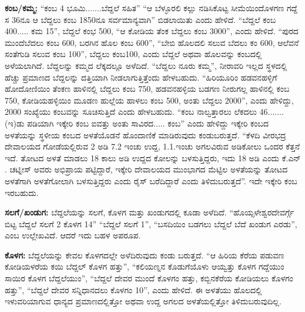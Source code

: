 \textbf{ಕಂಬ/ಕಮ್ಮ:} “ಕಂಬ 4 ಭೂಮಿ.......ಬೆದ್ದಲೆ ಸಹಿತ” “ಆ ಬೆಳ್ಳೂರಲಿ ಕಲ್ಲು ನಡಿಸಿಕೊಟ್ಟ ಸೀಮೆಯಿಂದೊಳಗಣ ಗದ್ದೆ ಸ 36ನೂ ಆ ಬೆದ್ದಲು ಕಂಬ 1850ನೂ ಸರ್ವಮಾನ್ಯವಾಗಿ” ಬಿಡಲಾಯಿತು ಎಂದು ಹೇಳಿದೆ. “ಬೆದ್ದಲೆ ಕಂಬ 400..... ಕಮ 15”, ಬೆದ್ದಲೆ ಕಂಭ 500, “ಆ ಕೋಡಿಯ ತೆಂಕ ಬೆದ್ದಲು ಕಂಬ 3000”, ಎಂದು ಹೇಳಿದೆ. “ಪುರದ ಮುಂದೆ\break ಬೆದಲು ಕಂಬ 600, ಬರಗಿನ ಹೊಲ ಕಂಬ 600”, “ಬೇಬಿ ಹೊಲದಲಿ ಸಲುವ ಬೆದಲು ಕಂ 600, ಆಲೆವನೆ ಸಂತೆಗುಡಿ ಸಲುವ ಕಂಬ 100”, ಬೆದ್ದಲು ಕಂಬ100, ಎಂದು ಬೆದ್ದಲೆ ಅಥವಾ ಹೊಲವನ್ನು ಕಂಬದಲ್ಲಿ ಅಳೆಯಲಾಗಿದೆ. ಬೆದ್ದಲನ್ನು ಕಮ್ಮದ ಲೆಕ್ಕದಲ್ಲೂ ಅಳೆದಿದೆ. “ಬೆದ್ದಲು ನೂರು ಕಮ್ಮ”, ನೀರಾವರಿ ಇಲ್ಲದ ಸ್ಥಳದಲ್ಲಿ ಹೆಚ್ಚು ಪ್ರಮಾಣದ ಬೆದ್ದಲನ್ನು ದತ್ತಿಯಾಗಿ ನೀಡಲಾಗುತ್ತಿತ್ತೆಂದು ಹೇಳಬಹುದು. “ಹಿರಿಯೂರಿಂ ಹಡವನಹಳ್ಳಿಗೆ ಹೋದೋಣಿಯಿಂ ತೆಂಕಣ ಹಾಳಿನಲ್ಲಿ ಬೆದ್ದಲು ಕಂಬ 750, ಹಡವನಹಳ್ಳಿಯ ಬಡಗಣ ನೀರುಗಲ್ಲ ಹಾಳಿನಲ್ಲಿ ಕಂಬ 750, ಕೋಡಿಯಹಳ್ಳಿಯಿಂ ಮೂಡಣ ಹುಲ್ಲೆಯ ಹಾಳಲು ಕಂಬ 500, ಅಂತು ಬೆದ್ದಲು 2000”, ಎಂದು ಹೇಳಿದ್ದು, 2000 ಸಂಖ್ಯೆಯು ಕಂಬವನ್ನು ಸೂಚಿಸುತ್ತಿದೆ ಎಂದು ಹೇಳಬಹುದು. “ಕಂಬ ನಾಲ್ವತ್ತಾರಲು ಲೆಕದಲು 46.......(ಇ)ಡು ಪಡಿಯಾಗಿ ಇಕ್ಕೇರಿ ಕಂಬ ಐವತ್ತು ಅಂತು ಸಾವಿರದ..... ಕಂಬ” ಎಂದು ಹೇಳಿದ್ದು ಇಕ್ಕೇರಿ ಕಂಬದ ಅಳತೆಯನ್ನು ಸ್ಥಳೀಯ ಕಂಬದ ಅಳತೆಯೊಡನೆ ಹೊಂದಾಣಿಕೆ ಮಾಡಿರುವುದು ಕಂಡುಬರುತ್ತದೆ. “ಕೆಳದಿ ವೀರಭದ್ರ ದೇವಾಲಯದ ಗೋಡೆಯಲ್ಲಿರುವ 2 ಅಡಿ 7.2 ಇಂಚು ಉದ್ದ, 1.1.ಇಂಚು ಅಗಲವಿರುವ ಅಡಿಕೋಲು ಒಂದರ ಕೆತ್ತನೆ ಇದೆ. ತೋಟದ ಅಳತೆ ಮಾಡಲು 18 ಕಾಲು ಅಡಿ ಉದ್ದದ ಕೋಲನ್ನು ಬಳಸುತ್ತಿದ್ದರು, ಇದು 18 ಅಡಿ ಎಂದು ಕೆ.ಎನ್​. ಚಟ್ನೀಸ್​ ಅವರು ಅಭಿಪ್ರಾಯ ಪಟ್ಟಿದ್ದಾರೆ, ಇಕ್ಕೇರಿ ದೇವಾಲಯದ ಮುಂಭಾಗದ ಮೆಟ್ಟಿಲ ಅಳತೆಯನ್ನು ತೋಟದ ಅಳತೆಗಾಗಿ ಅಳತೆಗೋಲಾಗಿ ಬಳಸುತ್ತಿದ್ದರು ಎಂದು ರೈಸ್​ ಬರೆದಿದ್ದಾರೆ ಎಂದು ತಿಳಿದುಬರುತ್ತದೆ”. ಇದೇ ಇಕ್ಕೇರಿ ಕಂಬ ಇರಬಹುದು.

\textbf{ಸಲಗೆ/ಖಂಡುಗ:} ಬೆದ್ದಲೆಯನ್ನು ಸಲಗೆ, ಕೊಳಗ ಮತ್ತು ಖಂಡುಗದಲ್ಲಿ ಕೂಡಾ ಅಳೆದಿದೆ. “ಹೊಯ್ಸಳೇಶ್ವರ\break ದೇವರ್ಗ್ಗೆ ಬಿಟ್ಟ ಬೆದ್ದಲೆ ಸಲಗೆ 2 ಕೊಳಗ 14” “ಬೆದ್ದಲೆ ಸಲಗೆ 1”, “ಬಸದಿಯಿಂ ಬಡಗಲು ಬೆದ್ದಲೆ ಬೆದೆ ಖಂಡುಗ ಎರಡು”, ಎಂಬ ಉಲ್ಲೇಖವಿದೆ. ಆದರೆ ಇದು ಬಹಳ ಅಪರೂಪ.

\textbf{ಕೊಳಗ:} ಬೆದ್ದಲೆಯನ್ನು ಕೇವಲ ಕೊಳಗದಲ್ಲೇ ಅಳೆದಿರುವುದು ಕಂಡು ಬರುತ್ತದೆ. “ಆ ಹಿರಿಯ ಕೆರೆಯ ಪಡುವಣ ಕೋಡಿಯಳರೆಯ ಕಯಿ ಬೆದ್ದಲ್​ ಕೊಳಗ ಹತ್ತು”, “ಕಲಿಯಣ್ನನ ಕೊಡುಗೆಯೊಳು ಆಯ್ವತ್ತು ಕೊಳಗ ಗದ್ದೆಯುಂ ಸಾಯಿರ ಕೊಳಗ ಬೆದ್ದಲೆಯುಂ”, “ಬೆದ್ದಲೆ ದೇವರ ಮುಂದೆ ಕೊಳಗಂ ಹತ್ತು, ಕಬ್ಬಿನಕೆರೆಯ ಕೋಡಿಯಲು ಕೊಳಗಂ ಹತ್ತು”, “ಬೆದ್ದಲೆ ದೇವರ ಸನ್ನಿಧಾನದಲು ಕೊಳಗಂ 10”, ಎಂದು ಹೇಳಿದೆ. ಈ ಅಳತೆಯು ಹೊಲದಲ್ಲಿ ಇಳುವರಿಯಾಗುವ ಧಾನ್ಯದ ಪ್ರಮಾಣದಲ್ಲಿತ್ತೋ ಅಥವಾ ಉದ್ದ ಅಗಲದ ಅಳತೆಯಲ್ಲಿತ್ತೋ ತಿಳಿದುಬರುವುದಿಲ್ಲ.

